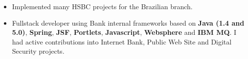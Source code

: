 \documentclass[10pt,a4paper,ragged2e,withhyper]{altacv}
\begin{document}
\begin{paracol}{2}
\divider


\begin{itemize}
\item Implemented many HSBC projects for the Brazilian branch.
\item Fullstack developer using Bank internal frameworks based on \textbf{Java (1.4 and 5.0)}, \textbf{Spring}, \textbf{JSF}, \textbf{Portlets}, \textbf{Javascript}, \textbf{Websphere} and \textbf{IBM MQ}. I had active contributions into Internet Bank, Public Web Site and Digital Security projects.
\end{itemize}






\newpage




\end{paracol}
\end{document}
